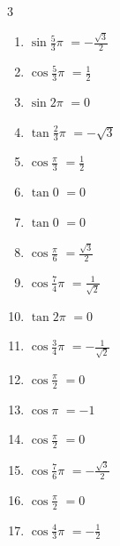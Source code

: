 \begin{multicols}{3}
\begin{enumerate}
  \item $\displaystyle \sin{\frac{5}{3}\pi}$
        $\displaystyle =-\frac{\sqrt{3}}{2}$

  \item $\displaystyle \cos{\frac{5}{3}\pi}$
        $\displaystyle =\frac{1}{2}$

  \item $\displaystyle \sin{2\pi}$
        $\displaystyle =0$

  \item $\displaystyle \tan{\frac{2}{3}\pi}$
        $\displaystyle =-\sqrt{3}$

  \item $\displaystyle \cos{\frac{\pi}{3}}$
        $\displaystyle =\frac{1}{2}$

  \item $\displaystyle \tan{0}$
        $\displaystyle =0$

  \item $\displaystyle \tan{0}$
        $\displaystyle =0$

  \item $\displaystyle \cos{\frac{\pi}{6}}$
        $\displaystyle =\frac{\sqrt{3}}{2}$

  \item $\displaystyle \cos{\frac{7}{4}\pi}$
        $\displaystyle =\frac{1}{\sqrt{2}}$

  \item $\displaystyle \tan{2\pi}$
        $\displaystyle =0$

  \item $\displaystyle \cos{\frac{3}{4}\pi}$
        $\displaystyle =-\frac{1}{\sqrt{2}}$

  \item $\displaystyle \cos{\frac{\pi}{2}}$
        $\displaystyle =0$

  \item $\displaystyle \cos{\pi}$
        $\displaystyle =-1$

  \item $\displaystyle \cos{\frac{\pi}{2}}$
        $\displaystyle =0$

  \item $\displaystyle \cos{\frac{7}{6}\pi}$
        $\displaystyle =-\frac{\sqrt{3}}{2}$

  \item $\displaystyle \cos{\frac{\pi}{2}}$
        $\displaystyle =0$

  \item $\displaystyle \cos{\frac{4}{3}\pi}$
        $\displaystyle =-\frac{1}{2}$


\end{enumerate}
\end{multicols}
